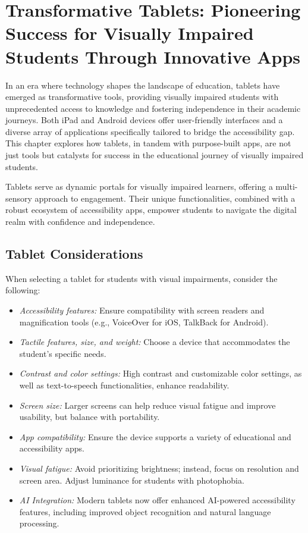 \chapter{Transformative Tablets: Pioneering Success for Visually Impaired Students Through Innovative Apps}\label{ios-devices}

In an era where technology shapes the landscape of education, tablets have emerged as transformative tools, providing visually impaired students with unprecedented access to knowledge and fostering independence in their academic journeys. Both iPad and Android devices offer user-friendly interfaces and a diverse array of applications specifically tailored to bridge the accessibility gap. This chapter explores how tablets, in tandem with purpose-built apps, are not just tools but catalysts for success in the educational journey of visually impaired students.
\cite{OrientationMobilityInstruction}

Tablets serve as dynamic portals for visually impaired learners, offering a multi-sensory approach to engagement. Their unique functionalities, combined with a robust ecosystem of accessibility apps, empower students to navigate the digital realm with confidence and independence.

\section{Tablet Considerations}\label{tablet-considerations}

When selecting a tablet for students with visual impairments, consider the following:

\begin{itemize}
    \item \emph{Accessibility features:} Ensure compatibility with screen readers and magnification tools (e.g., VoiceOver for iOS, TalkBack for Android).
    \cite{AndroidAccessibility}
    \item \emph{Tactile features, size, and weight:} Choose a device that accommodates the student's specific needs.
    \item \emph{Contrast and color settings:} High contrast and customizable color settings, as well as text-to-speech functionalities, enhance readability.
    \item \emph{Screen size:} Larger screens can help reduce visual fatigue and improve usability, but balance with portability.
    \item \emph{App compatibility:} Ensure the device supports a variety of educational and accessibility apps.
    \item \emph{Visual fatigue:} Avoid prioritizing brightness; instead, focus on resolution and screen area. Adjust luminance for students with photophobia.
    \item \emph{AI Integration:} Modern tablets now offer enhanced AI-powered accessibility features, including improved object recognition and natural language processing.
\end{itemize}

